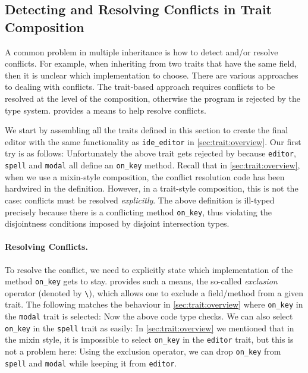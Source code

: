 \subsection{Detecting and Resolving Conflicts in Trait Composition}

A common problem in multiple inheritance is how to detect and/or resolve conflicts. For example, when
inheriting from two traits that have the same field, then it is unclear which
implementation to choose. There are various approaches to dealing with
conflicts. The trait-based approach requires conflicts to be resolved at the
level of the composition, otherwise the program is rejected by
the type system. \sedel provides a means to help resolve conflicts.

We start by assembling all the traits defined in this section
to create the final editor with the same functionality as
\lstinline{ide_editor} in \cref{sec:trait:overview}. Our first try is as follows:
Unfortunately the above trait gets rejected by \sedel because
\lstinline{editor}, \lstinline{spell} and \lstinline{modal} all define an \lstinline{on_key} method.
Recall that in \cref{sec:trait:overview}, when we use a mixin-style composition,
the conflict resolution code has been hardwired in the definition.
However, in a trait-style composition, this is not the case: conflicts must be resolved \emph{explicitly}.
The
above definition is ill-typed precisely because there is a conflicting
method \lstinline{on_key}, thus violating the disjointness conditions
imposed by disjoint intersection types.

\paragraph{Resolving Conflicts.}
To resolve the conflict, we need to explicitly state which implementation of the method
\lstinline{on_key} gets to stay. \sedel provides such a means, the so-called
\emph{exclusion} operator (denoted by \lstinline$\$), which allows one to
exclude a field/method from a given trait. The following matches the behaviour
in \cref{sec:trait:overview} where \lstinline{on_key} in the \lstinline{modal} trait
is selected:
Now the above code type checks. We can also select \lstinline{on_key} in the \lstinline{spell} trait as easily:
In \cref{sec:trait:overview} we mentioned that in the mixin style, it is impossible
to select \lstinline{on_key} in the \lstinline{editor} trait, but this is not a problem here:
Using the exclusion operator, we can drop \lstinline{on_key} from \lstinline{spell} and \lstinline{modal} while
keeping it from \lstinline{editor}.


